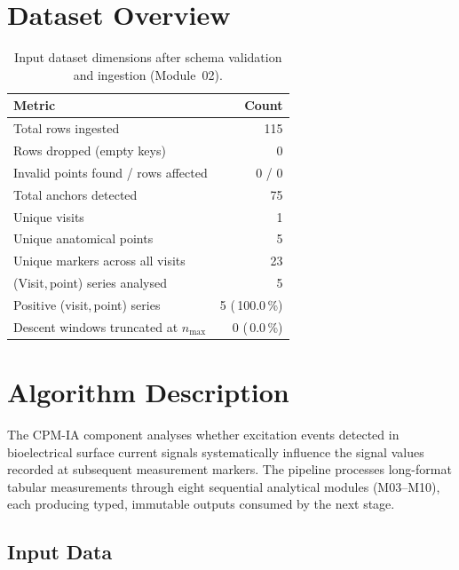 \documentclass[a4paper,11pt]{article}
\begin{document}
\section{Dataset Overview}

\begin{table}[h!]
\centering
\small
\caption{Input dataset dimensions after schema validation and ingestion (Module~02).}
\begin{tabular}{lr}
\toprule
\textbf{Metric} & \textbf{Count} \\
\midrule
Total rows ingested                        & 115 \\
Rows dropped (empty keys)                  & 0 \\
Invalid points found / rows affected       & 0 / 0 \\
Total anchors detected                     & 75 \\
Unique visits                          & 1 \\
Unique anatomical points               & 5 \\
Unique markers across all visits       & 23 \\
(Visit,\,point) series analysed        & 5 \\
Positive (visit,\,point) series        & 5 (\,100.0\,\%) \\
Descent windows truncated at $n_{\max}$ & 0 (\,0.0\,\%) \\
\bottomrule
\end{tabular}
\end{table}

\section{Algorithm Description}

The CPM-IA component analyses whether excitation events detected in bioelectrical surface
current signals systematically influence the signal values recorded at subsequent measurement
markers. The pipeline processes long-format tabular measurements through eight sequential
analytical modules (M03--M10), each producing typed, immutable outputs consumed by the next
stage.

\subsection{Input Data}
\end{document}
